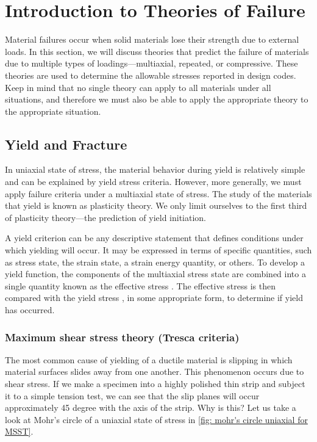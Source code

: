 \documentclass[
10pt,
a4paper,
openany,
svgnames,
]{book}
\begin{document}

\chapter{Introduction to Theories of Failure}

Material failures occur when solid materials lose their strength due to external loads. In this section, we will discuss theories that predict the failure of materials due to multiple types of loadings—multiaxial, repeated, or compressive. These theories are used to determine the allowable stresses reported in design codes. Keep in mind that no single theory can apply to all materials under all situations, and therefore we must also be able to apply the appropriate theory to the appropriate situation.

\section{Yield and Fracture}

In uniaxial state of stress, the material behavior during yield is relatively simple and can be explained by yield stress criteria. However, more generally, we must apply failure criteria under a multiaxial state of stress. The study of the materials that yield is known as plasticity theory. We only limit ourselves to the first third of plasticity theory—the prediction of yield initiation.

A yield criterion can be any descriptive statement that defines conditions under which yielding will occur. It may be expressed in terms of specific quantities, such as stress state, the strain state, a strain energy quantity, or others. To develop a yield function, the components of the multiaxial stress state are combined into a single quantity known as the effective stress . The effective stress is then compared with the yield stress , in some appropriate form, to determine if yield has occurred.

\subsection{Maximum shear stress theory (Tresca criteria)}

The most common cause of yielding of a ductile material is slipping in which material surfaces slides away from one another. This phenomenon occurs due to shear stress. If we make a specimen into a highly polished thin strip and subject it to a simple tension test, we can see that the slip planes will occur approximately 45 degree with the axis of the strip. Why is this? Let us take a look at Mohr's circle of a uniaxial state of stress in \cref{fig: mohr's circle uniaxial for MSST}.
\end{document}
